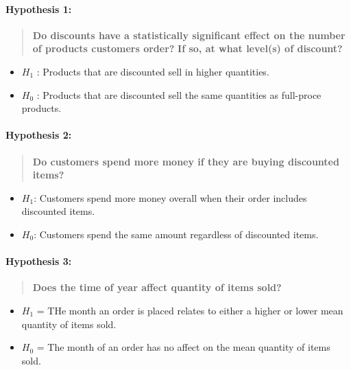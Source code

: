 \documentclass[11pt]{article}
\providecommand{\tightlist}{%
      \setlength{\itemsep}{0pt}\setlength{\parskip}{0pt}}
\begin{document}
\hypertarget{hypothesis-1}{%
\paragraph{Hypothesis 1:}\label{hypothesis-1}}

\begin{quote}
\textbf{Do discounts have a statistically significant effect on the
number of products customers order?} \textbf{If so, at what level(s) of
discount?}
\end{quote}

\begin{itemize}
\item
  \(H_1\) : Products that are discounted sell in higher quantities.
\item
  \(H_0\) : Products that are discounted sell the same quantities as
  full-proce products.
\end{itemize}

\hypertarget{hypothesis-2}{%
\paragraph{Hypothesis 2:}\label{hypothesis-2}}

\begin{quote}
\textbf{Do customers spend more money if they are buying discounted
items?}
\end{quote}

\begin{itemize}
\item
  \(H_1\): Customers spend more money overall when their order includes
  discounted items.
\item
  \(H_0\): Customers spend the same amount regardless of discounted
  items.
\end{itemize}

\hypertarget{hypothesis-3}{%
\paragraph{Hypothesis 3:}\label{hypothesis-3}}

\begin{quote}
\textbf{Does the time of year affect quantity of items sold?}
\end{quote}

\begin{itemize}
\tightlist
\item
  \(H_1\) = THe month an order is placed relates to either a higher or
  lower mean quantity of items sold.
\item
  \(H_0\) = The month of an order has no affect on the mean quantity of
  items sold.
\end{itemize}
\end{document}
